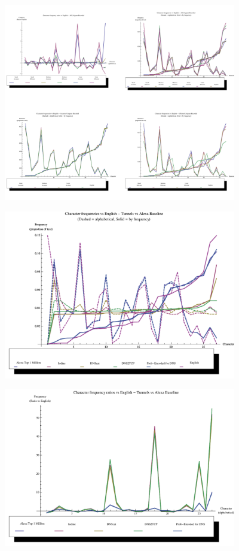 \documentclass[12pt]{report}
\theoremstyle{remark}
\theoremstyle{definition}
\theoremstyle{definition}
\theoremstyle{definition}
\begin{document}
\begin{figure}
\centering
\includegraphics[width=4in]{figures/plots_unigram.pdf}
\end{figure}
\begin{figure}
\centering
\includegraphics[width=4in]{figures/tunnels-freqabs.pdf}
\end{figure}
\begin{figure}
\centering
\includegraphics[width=4in]{figures/tunnels-freqrel.pdf}
\end{figure}
\end{document}
